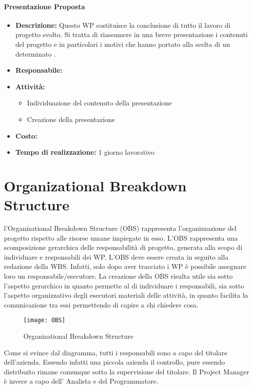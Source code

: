 \paragraph{Presentazione Proposta}
\begin{itemize}
\item{\bfseries Descrizione:} Questo WP costituisce la conclusione di tutto il lavoro di progetto svolto. Si tratta di riassumere in una breve presentazione i contenuti del progetto e in particolari i motivi che hanno portato alla scelta di un determinato .
\item {\bfseries Responsabile:}
\item  {\bfseries Attività:}
\begin{itemize}
	\item Individuazione del contenuto della presentazione
	\item Creazione della presentazione
	\end{itemize}


\item  {\bfseries Costo:}
\item  {\bfseries Tempo di realizzazione:}  1 giorno lavorativo
\end{itemize}




\section{Organizational Breakdown Structure}
l'Organizational Breakdown Structure (OBS) rappresenta l'organizzazione del progetto rispetto alle risorse umane impiegate in esso.
L'OBS rappresenta una scomposizione gerarchica delle responsabilità di progetto, generata alla scopo di individuare e responsabili dei WP. 
L'OBS deve essere creata in seguito alla redazione della WBS. Infatti, solo dopo aver tracciato i WP è possibile assegnare loro un responsabile/esecutore.
La creazione della OBS risulta utile sia sotto l'aspetto gerarchico in quanto permette al  di individuare i responsabili, sia sotto l'aspetto organizzativo degli esecutori materiali delle attività, in quanto facilita la comunicazione tra essi permettendo di capire a chi chiedere cosa. 

\clearpage
\begin{figure}[h!]
  \texttt{[image: OBS]}
	\caption{Organizational Breakdown Structure}
\end{figure}


Come si evince dal diagramma, tutti i responsabili sono a capo del titolare dell'azienda. Essendo infatti una piccola azienda il controllo, pure essendo distribuito rimane comunque sotto la supervisione del titolare.
Il Project Manager è invece a capo dell' Analista e del Programmatore. 
 
